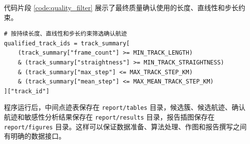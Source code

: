 \documentclass[UTF8,a4paper,12pt]{ctexart}
\numberwithin{figure}{section}
\numberwithin{table}{section}
\begin{document}
代码片段 \ref{code:quality_filter} 展示了最终质量确认使用的长度、直线性和步长约束。

\begin{lstlisting}[style=PythonStyle,caption={航迹质量确认代码},label={code:quality_filter}]
# 按持续长度、直线性和步长约束筛选确认航迹
qualified_track_ids = track_summary[
    (track_summary["frame_count"] >= MIN_TRACK_LENGTH)
    & (track_summary["straightness"] >= MIN_TRACK_STRAIGHTNESS)
    & (track_summary["max_step"] <= MAX_TRACK_STEP_KM)
    & (track_summary["mean_step"] <= MAX_MEAN_TRACK_STEP_KM)
]["track_id"]
\end{lstlisting}

程序运行后，中间点迹表保存在 \texttt{report/tables} 目录，候选簇、候选航迹、确认航迹和敏感性分析结果保存在 \texttt{report/results} 目录，报告插图保存在 \texttt{report/figures} 目录。这样可以保证数据准备、算法处理、作图和报告撰写之间有明确的数据接口。
\end{document}
